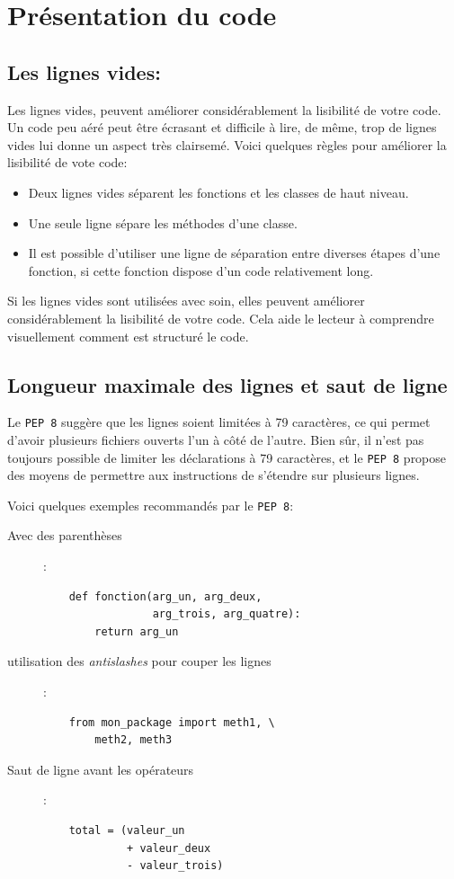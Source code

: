 \documentclass[a4paper,11pt]{book}
\begin{document}
\section{Présentation du code}
\subsection*{Les lignes vides:}
Les lignes vides, peuvent améliorer considérablement la lisibilité de votre code. Un code peu aéré peut être écrasant et difficile à lire, de même, trop de lignes vides lui donne un aspect très clairsemé. Voici quelques règles pour améliorer la lisibilité de vote code:
\begin{itemize}
	\item Deux lignes vides séparent les fonctions et les classes de haut niveau.
	\item Une seule ligne sépare les méthodes d'une classe.
	\item Il est possible d'utiliser une ligne de séparation entre diverses étapes d'une fonction, si cette fonction dispose d'un code relativement long.
\end{itemize}
\medskip

Si les lignes vides sont utilisées avec soin, elles peuvent améliorer considérablement la lisibilité de votre code. Cela aide le lecteur à comprendre visuellement comment est structuré le code. 
\medskip

\subsection*{Longueur maximale des lignes et saut de ligne}
Le \texttt{PEP 8} suggère que les lignes soient limitées à 79 caractères,  ce qui permet d'avoir plusieurs fichiers ouverts l'un à côté de l'autre. Bien sûr, il n'est pas toujours possible de limiter les déclarations à 79 caractères, et le \texttt{PEP 8} propose des moyens de permettre aux instructions de s'étendre sur plusieurs lignes.
\medskip

Voici quelques exemples recommandés par le \texttt{PEP 8}:
\begin{description}
	\item[Avec des parenthèses]: 
	\begin{lstlisting}
	def fonction(arg_un, arg_deux,
                 arg_trois, arg_quatre):
        return arg_un
	\end{lstlisting}
	\item[utilisation des \textit{antislashes} pour couper les lignes]:
	\begin{lstlisting}
	from mon_package import meth1, \
        meth2, meth3
	\end{lstlisting}
	\item[Saut de ligne avant les opérateurs]:
	\begin{lstlisting}
	total = (valeur_un
             + valeur_deux
             - valeur_trois)
	\end{lstlisting}
\end{description}
\medskip
\end{document}
